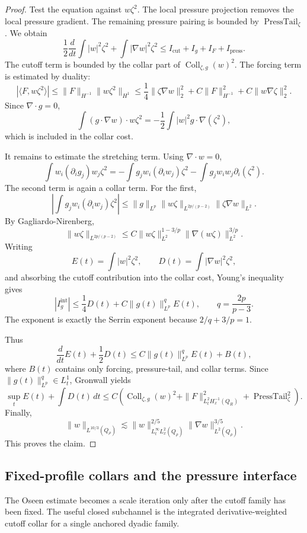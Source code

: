 \documentclass[11pt]{article}
\begin{document}
\begin{proof}
Test the equation against \(w\zeta^2\).  The local pressure projection removes
the local pressure gradient.  The remaining pressure pairing is bounded by
\(\operatorname{PressTail}_{\zeta}\).  We obtain
\[
\frac12\frac{d}{dt}\int |w|^2\zeta^2
+\int |\nabla w|^2\zeta^2
\le
I_{\mathrm{cut}}+I_g+I_F+I_{\mathrm{press}}.
\]
The cutoff term is bounded by the collar part of
\(\operatorname{Coll}_{\zeta,g}(w)^2\).  The forcing term is estimated by
duality:
\[
|\langle F,w\zeta^2\rangle|
\le
\|F\|_{H^{-1}}\|w\zeta^2\|_{H^1}
\le
\frac14\|\zeta\nabla w\|_2^2
+C\|F\|_{H^{-1}}^2
+C\|w\nabla\zeta\|_2^2.
\]
Since \(\nabla\cdot g=0\),
\[
\int (g\cdot\nabla w)\cdot w\zeta^2
=
-\frac12\int |w|^2g\cdot\nabla(\zeta^2),
\]
which is included in the collar cost.

It remains to estimate the stretching term. Using \(\nabla\cdot w=0\),
\[
\int w_i(\partial_i g_j)w_j\zeta^2
=
-\int g_jw_i(\partial_i w_j)\zeta^2
-\int g_jw_iw_j\partial_i(\zeta^2).
\]
The second term is again a collar term. For the first,
\[
\left|
\int g_jw_i(\partial_i w_j)\zeta^2
\right|
\le
\|g\|_{L^p}
\|w\zeta\|_{L^{2p/(p-2)}}
\|\zeta\nabla w\|_{L^2}.
\]
By Gagliardo-Nirenberg,
\[
\|w\zeta\|_{L^{2p/(p-2)}}
\le
C
\|w\zeta\|_{L^2}^{1-3/p}
\|\nabla(w\zeta)\|_{L^2}^{3/p}.
\]
Writing
\[
E(t)=\int |w|^2\zeta^2,
\qquad
D(t)=\int |\nabla w|^2\zeta^2,
\]
and absorbing the cutoff contribution into the collar cost, Young's inequality gives
\[
|I_g^{\mathrm{int}}|
\le
\frac14D(t)+C\|g(t)\|_{L^p}^{q}E(t),
\qquad
q=\frac{2p}{p-3}.
\]
The exponent is exactly the Serrin exponent because \(2/q+3/p=1\).

Thus
\[
\frac{d}{dt}E(t)+\frac12D(t)
\le
C\|g(t)\|_{L^p}^{q}E(t)+B(t),
\]
where \(B(t)\) contains only forcing, pressure-tail, and collar terms. Since \(\|g(t)\|_{L^p}^{q}\in L^1_t\), Gronwall yields
\[
\sup_tE(t)+\int D(t)\,dt
\le
C
\left(
\operatorname{Coll}_{\zeta,g}(w)^2
+\|F\|_{L^2_tH^{-1}_x(Q_R)}^2
+\operatorname{PressTail}_{\zeta}^2
\right).
\]
Finally,
\[
\|w\|_{L^{10/3}(Q_\rho)}
\lesssim
\|w\|_{L^\infty_tL^2_x(Q_\rho)}^{2/5}
\|\nabla w\|_{L^2(Q_\rho)}^{3/5}.
\]
This proves the claim.
\end{proof}

\subsection{Fixed-profile collars and the pressure interface}

The Oseen estimate becomes a scale iteration only after the cutoff family has
been fixed.  The useful closed subchannel is the integrated derivative-weighted
cutoff collar for a single anchored dyadic family.
\end{document}
